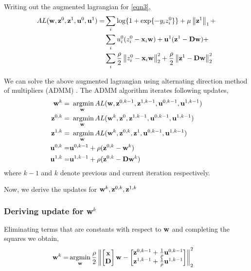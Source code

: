 \documentclass[conference,10pt,draftclsnofoot,onecolumn]{IEEEtran}
\begin{document}
Writing out the augmented lagrangian for \eqref{eqn3},
\begin{align}
\label{eqn4}
AL(\ww, \zz^0, \zz^1, \uu^0, \uu^1) = & \sum_i \log\{1+\exp\{-y_{i}z_{i}^{0}\}\} + \mu\nrmo{\zz^1} + \notag \\
& \sum_{i} u_{i}^{0} (z_{i}^{0} - \xx_{i}\ww) + \uu^{1} (\zz^{1} - \DD\ww) + \\
& \sum_{i} \frac{\rho}{2} \nrmt{z_{i}^{0} - \xx_{i}\ww}^{2} + \frac{\rho}{2} \nrmt{\zz^{1} - \DD\ww}^{2} \notag
\end{align}

We can solve the above augmented lagrangian using alternating direction method of multipliers (ADMM) \cite{jojic12}. The ADMM algorithm
iterates following updates,
\begin{align}
    \label{eqn5}
    \ww^k = & \mathop{\textrm{ argmin}}_\ww AL(\ww, \zz^{0, k-1}, \zz^{1, k-1}, \uu^{0, k-1}, \uu^{1, k-1}) \notag\\
    \zz^{0, k} = & \mathop{\textrm{ argmin}}_\ww AL(\ww^k, \zz^{0}, \zz^{1, k-1}, \uu^{0, k-1}, \uu^{1, k-1})\notag\\
    \zz^{1, k} = & \mathop{\textrm{ argmin}}_\ww AL(\ww^k, \zz^{0, k}, \zz^{1}, \uu^{0, k-1}, \uu^{1, k-1}) \\
    \uu^{0, k} = & \uu^{0, k-1} + \rho (\zz^{0, k} - \ww^k) \notag\\
    \uu^{1, k} = & \uu^{1, k-1} + \rho (\zz^{0, k} - \DD\ww^k)\notag
\end{align}
where $k - 1$ and $k$ denote previous and current iteration respectively.

Now, we derive the updates for $\mathbf{w}^k, \mathbf{z}^{0, k}, \mathbf{z}^{1, k}$

\subsubsection{Deriving update for \textbf{w}$^k$}
\label{subsubsec:wupdate}
Eliminating terms that are constants with respect to $\mathbf{w}$ and completing the squares we obtain,
\begin{align}
\label{eqn6}
\ww^k =& \argmin_\ww \frac{\rho}{2} \nrmt{\begin{bmatrix} \xx \\ \DD \end{bmatrix}\ww - \begin{bmatrix} \zz^{0,k-1} + \frac{1}{\rho} \uu^{0, k-1} \\ \zz^{1,k-1} + \frac{1}{\rho} \uu^{1, k-1} \end{bmatrix} }^{2} 
\end{align}
\end{document}

